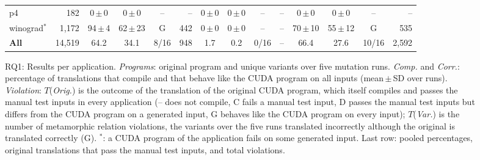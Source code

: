 \begin{figure}[!t]
\begin{tabular}{lr|c|c|cr|c|c|cr|c|c|cr}
p4 & 182 & \phantom{00}0\,$\pm$\,\phantom{0}0 & \phantom{00}0\,$\pm$\,\phantom{0}0 & -- & -- & \phantom{00}0\,$\pm$\,\phantom{0}0 & \phantom{00}0\,$\pm$\,\phantom{0}0 & -- & -- & \phantom{00}0\,$\pm$\,\phantom{0}0 & \phantom{00}0\,$\pm$\,\phantom{0}0 & -- & -- \\
winograd$^{*}$ & 1{,}172 & \phantom{0}94\,$\pm$\,\phantom{0}4 & \phantom{0}62\,$\pm$\,23 & \textsf{G} & 442 & \phantom{00}0\,$\pm$\,\phantom{0}0 & \phantom{00}0\,$\pm$\,\phantom{0}0 & -- & -- & \phantom{0}70\,$\pm$\,10 & \phantom{0}55\,$\pm$\,12 & \textsf{G} & 535 \\
\hline
\textbf{All} & 14{,}519 & 64.2 & 34.1 & 8/16 & 948 & \phantom{0}1.7 & \phantom{0}0.2 & 0/16 & -- & 66.4 & 27.6 & 10/16 & 2{,}592 \\
\hline
\end{tabular}
\caption{RQ1: Results per application. \emph{Programs}: original program and unique variants over five mutation runs. \emph{Comp.} and \emph{Corr.}: percentage of translations that compile and that behave like the CUDA program on all inputs (mean\,$\pm$\,SD over runs). \emph{Violation}: $T$(\emph{Orig.}) is the outcome of the translation of the original CUDA program, which itself compiles and passes the manual test inputs in every application (-- does not compile, \textsf{C} fails a manual test input, \textsf{D} passes the manual test inputs but differs from the CUDA program on a generated input, \textsf{G} behaves like the CUDA program on every input); $T$(\emph{Var.}) is the number of metamorphic relation violations, the variants over the five runs translated incorrectly although the original is translated correctly (\textsf{G}). $^{*}$: a CUDA program of the application fails on some generated input. Last row: pooled percentages, original translations that pass the manual test inputs, and total violations.}
\label{tab:rq1}
\end{figure}
